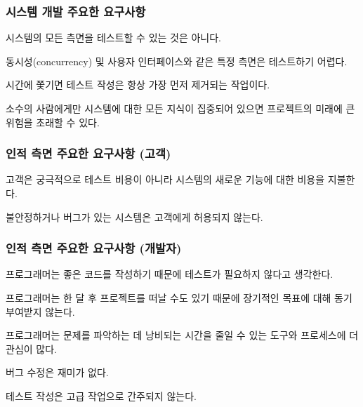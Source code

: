 \documentclass[a4paper,10pt,twoside]{book}
\begin{document}
\subsubsection*{시스템 개발 주요한 요구사항}

\begin{bulletlist}
\item 시스템의 모든 측면을 테스트할 수 있는 것은 아니다.

\item 동시성(concurrency) 및 사용자 인터페이스와 같은 특정 측면은 테스트하기 어렵다.

\item 시간에 쫓기면 테스트 작성은 항상 가장 먼저 제거되는 작업이다.

\item 소수의 사람에게만 시스템에 대한 모든 지식이 집중되어 있으면 프로젝트의 미래에 큰 위험을 초래할 수 있다.
\end{bulletlist}

\subsubsection*{인적 측면 주요한 요구사항 (고객)}

\begin{bulletlist}
\item 고객은 궁극적으로 테스트 비용이 아니라 시스템의 새로운 기능에 대한 비용을 지불한다.

\item 불안정하거나 버그가 있는 시스템은 고객에게 허용되지 않는다.
\end{bulletlist}

\subsubsection*{인적 측면 주요한 요구사항 (개발자)}

\begin{bulletlist}
\item 프로그래머는 좋은 코드를 작성하기 때문에 테스트가 필요하지 않다고 생각한다. 

\item 프로그래머는 한 달 후 프로젝트를 떠날 수도 있기 때문에 장기적인 목표에 대해 동기 부여받지 않는다. 

\item 프로그래머는 문제를 파악하는 데 낭비되는 시간을 줄일 수 있는 도구와 프로세스에 더 관심이 많다.

\item 버그 수정은 재미가 없다.

\item 테스트 작성은 고급 작업으로 간주되지 않는다.
\end{bulletlist}
\end{document}

